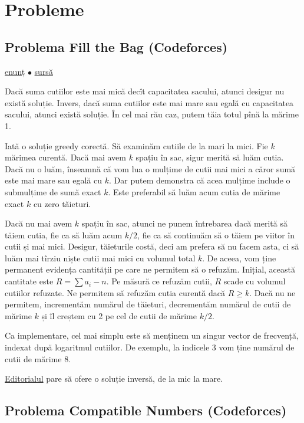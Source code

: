 \section{Probleme}

\subsection{Problema Fill the Bag (Codeforces)}
\label{problem:fill-the-bag}

\href{https://codeforces.com/contest/1303/problem/D}{enunț}
$\bullet$
\hyperref[code:fill-the-bag]{sursă}

Dacă suma cutiilor este mai mică decît capacitatea sacului, atunci desigur nu există soluție. Invers, dacă suma cutiilor este mai mare sau egală cu capacitatea sacului, atunci există soluție. În cel mai rău caz, putem tăia totul pînă la mărime 1.

Iată o soluție greedy corectă. Să examinăm cutiile de la mari la mici. Fie $k$ mărimea curentă. Dacă mai avem $k$ spațiu în sac, sigur merită să luăm cutia. Dacă nu o luăm, înseamnă că vom lua o mulțime de cutii mai mici a căror sumă este mai mare sau egală cu $k$. Dar putem demonstra că acea mulțime include o submulțime de sumă exact $k$. Este preferabil să luăm acum cutia de mărime exact $k$ cu zero tăieturi.

Dacă nu mai avem $k$ spațiu în sac, atunci ne punem întrebarea dacă merită să tăiem cutia, fie ca să luăm acum $k/2$, fie ca să continuăm să o tăiem pe viitor în cutii și mai mici. Desigur, tăieturile costă, deci am prefera să nu facem asta, ci să luăm mai tîrziu niște cutii mai mici cu volumul total $k$. De aceea, vom ține permanent evidența cantității pe care ne permitem să o refuzăm. Inițial, această cantitate este $R = \sum a_i - n$. Pe măsură ce refuzăm cutii, $R$ scade cu volumul cutiilor refuzate. Ne permitem să refuzăm cutia curentă dacă $R \geq k$. Dacă nu ne permitem, incrementăm numărul de tăieturi, decrementăm numărul de cutii de mărime $k$ și îl creștem cu 2 pe cel de cutii de mărime $k/2$.

Ca implementare, cel mai simplu este să menținem un singur vector de frecvență, indexat după logaritmul cutiilor. De exemplu, la indicele 3 vom ține numărul de cutii de mărime 8.

\href{https://codeforces.com/blog/entry/73872}{Editorialul} pare să ofere o soluție inversă, de la mic la mare.


\subsection{Problema Compatible Numbers (Codeforces)}
\label{problem:compatible-numbers}

